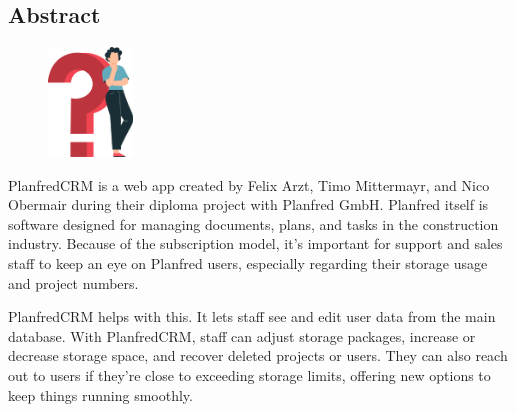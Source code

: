 \begin{spacing}{1}
    \chapter*{Abstract}
\end{spacing}
\begin{figure}
    \begin{center}
      \includegraphics[width=0.2\textwidth]{pics/question_mark.png}
    \end{center}
\end{figure}
PlanfredCRM is a web app created by Felix Arzt, Timo Mittermayr, and Nico Obermair during their diploma project with Planfred GmbH. Planfred itself is software designed for managing documents, plans, and tasks in the construction industry. Because of the subscription model, it's important for support and sales staff to keep an eye on Planfred users, especially regarding their storage usage and project numbers.

PlanfredCRM helps with this. It lets staff see and edit user data from the main database. With PlanfredCRM, staff can adjust storage packages, increase or decrease storage space, and recover deleted projects or users. They can also reach out to users if they're close to exceeding storage limits, offering new options to keep things running smoothly.

